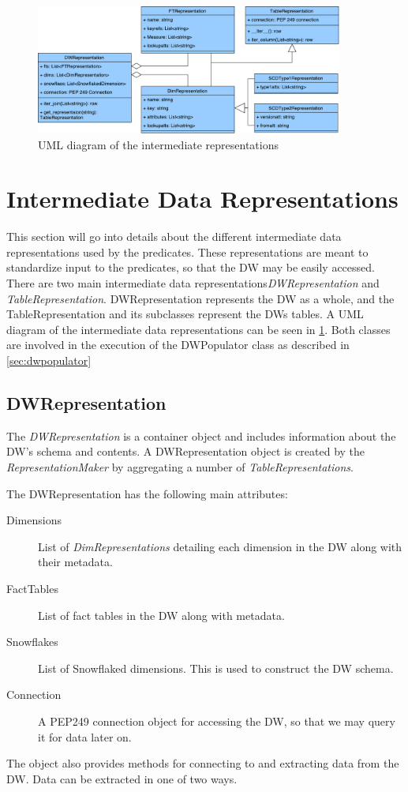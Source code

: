 \begin{figure}
\centering
\includegraphics[width=0.9\textwidth]{figures/dwrep_uml.pdf}
\caption{UML diagram of the intermediate representations}
\label{fig:dwrep}
\end{figure}

\section{Intermediate Data Representations}

This section will go into details about the different intermediate data representations used by the predicates. These representations are meant to standardize input to the predicates, so that the DW may be easily accessed. There are two main intermediate data representations\textit{DWRepresentation} and \textit{TableRepresentation}. DWRepresentation represents the DW as a whole, and the TableRepresentation and its subclasses represent the DWs tables. A UML diagram of the intermediate data representations can be seen in \cref{fig:dwrep}. Both classes are involved in the execution of the DWPopulator class as described in \cref{sec:dwpopulator}

\subsection{DWRepresentation}
The \textit{DWRepresentation} is a container object and includes information about the DW's schema and contents. A DWRepresentation object is created by the \textit{RepresentationMaker} by aggregating a number of \textit{TableRepresentations}.

The DWRepresentation has the following main attributes:

\begin{description}
\item[Dimensions] List of \textit{DimRepresentations} detailing each dimension in the DW along with their metadata.
\item[FactTables] List of fact tables in the DW along with metadata.
\item[Snowflakes] List of Snowflaked dimensions. This is used to construct the DW schema.
\item[Connection] A PEP249 connection object for accessing the DW, so that we may query it for data later on.
\end{description}
The object also provides methods for connecting to and extracting data from the DW. Data can be extracted in one of two ways.

